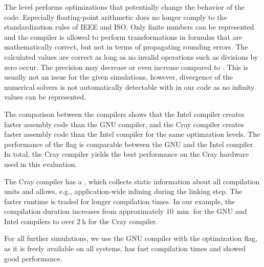 The  level performs optimizations that potentially change the behavior of the code. 
Especially floating-point arithmetic does no longer comply to the standardization rules of IEEE and ISO. Only finite numbers can be represented and the compiler is allowed to perform transformations in formulas that are mathematically correct, but not in terms of propagating rounding errors. The calculated values are correct as long as no invalid operations such as divisions by zero occur. The precision may decrease or even increase compared to . This is usually not an issue for the given simulations, however, divergence of the numerical solvers is not automatically detectable with  in our code as no infinity values can be represented.

The comparison between the compilers shows that the Intel compiler creates faster assembly code than the GNU compiler, and the Cray compiler creates faster assembly code than the Intel compiler for the same optimzation levels. The performance of the  flag is comparable between the GNU and the Intel compiler. In total, the Cray compiler yields the best performance on the Cray hardware used in this evaluation. 

The Cray compiler has a , which collects static information about all compilation units and allows, e.g., application-wide inlining during the linking step. The faster runtime is traded for longer compilation times. In our example, the compilation duration increases from approximately $\SI{10}{\min}$ for the GNU and Intel compilers to over $\SI{2}{\hour}$ for the Cray compiler.

For all further simulations, we use the GNU compiler with the  optimization flag, as it is freely available on all systems, has fast compilation times and showed good performance.

